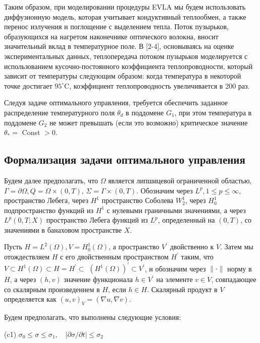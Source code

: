 Таким образом, при моделировании процедуры EVLA мы будем использовать диффузионную модель,
которая учитывает кондуктивный теплообмен, а также перенос излучения и поглощение с выделением тепла.
Поток пузырьков, образующихся на нагретом наконечнике оптического волокна, вносит значительный
вклад в температурное поле. В [2-4], основываясь на оценке экспериментальных данных,
теплопередача потоком пузырьков моделируется с использованием кусочно-постоянного
коэффициента теплопроводности, который зависит от температуры следующим образом:
когда температура в некоторой точке достигает $95 ^ {\circ} \mathrm{C}$,
коэффициент теплопроводность увеличивается в 200 раз.

Следуя задаче оптимального управления, требуется обеспечить заданное распределение
температурного поля $\theta_{d}$ в поддомене $G_{1}$,
при этом температура в поддомене $G_{2}$ не может превышать
(если это возможно) критическое значение $\theta_{*}=$ Const $>0$.

\subsection{Формализация задачи оптимального управления}
\label{subsec:ch3:sec2:subsec2}

Будем далее предполагать, что $\Omega$ является липшицевой ограниченной областью,
$\Gamma=\partial \Omega, Q=\Omega \times(0, T)$, $\Sigma=\Gamma \times(0, T)$.
Обозначим через $L^{p}, 1 \leq p \leq \infty$, пространство Лебега,
через $H^{1}$ пространство Соболева $W_{2}^{1}$,
через $H_{ 0}^{1}$ подпространство функций из $H^{1}$ с нулевыми граничными значениями,
а через $L^{p}(0, T ; X)$ пространство Лебега функций из $L^{ p}$,
определенный на $(0, T)$, со значениями в банаховом пространстве $X$.

Пусть $H=L^{2}(\Omega), V=H_{0}^{1}(\Omega)$, а пространство $V^{\prime}$ двойственно к $V$.
Затем мы отождествляем $H$ с его двойственным пространством $H^{\prime}$ таким,
что $V \subset H^{1}(\Omega) \subset H=H^{\prime} \subset$
$\left( H^{1}(\Omega)\right)^{\prime} \subset V^{\prime}$,
и обозначим через $\|\cdot\|$ норму в $H$,
а через $(h , v)$ значение функционала $h \in V^{\prime}$
на элементе $v \in V$, совпадающее со скалярным произведением в $H$, если $h \in H$.
Скалярный продукт в $V$ определяется как $(u, v)_{V}=(\nabla u, \nabla v)$.


Будем предполагать, что выполнены следующие условия:

(c1) $\sigma_{0} \leq \sigma \leq \sigma_{1}, \quad|\partial \sigma / \partial t| \leq \sigma_{2}$

